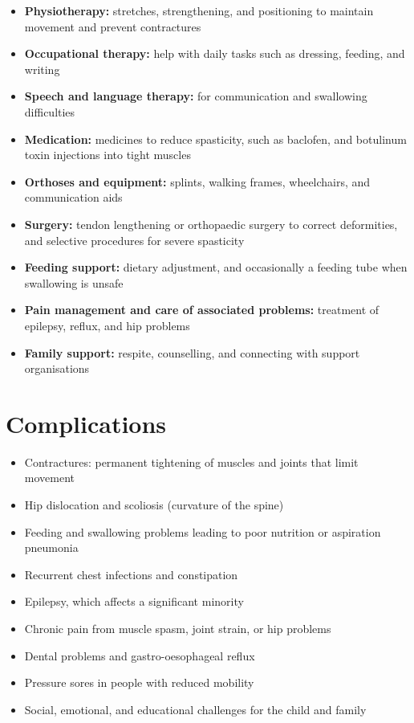 \begin{itemize}
    \item \textbf{Physiotherapy:} stretches, strengthening, and positioning to maintain movement and prevent contractures
    \item \textbf{Occupational therapy:} help with daily tasks such as dressing, feeding, and writing
    \item \textbf{Speech and language therapy:} for communication and swallowing difficulties
    \item \textbf{Medication:} medicines to reduce spasticity, such as baclofen, and botulinum toxin injections into tight muscles
    \item \textbf{Orthoses and equipment:} splints, walking frames, wheelchairs, and communication aids
    \item \textbf{Surgery:} tendon lengthening or orthopaedic surgery to correct deformities, and selective procedures for severe spasticity
    \item \textbf{Feeding support:} dietary adjustment, and occasionally a feeding tube when swallowing is unsafe
    \item \textbf{Pain management and care of associated problems:} treatment of epilepsy, reflux, and hip problems
    \item \textbf{Family support:} respite, counselling, and connecting with support organisations
\end{itemize}

\section*{Complications}
\begin{itemize}
    \item Contractures: permanent tightening of muscles and joints that limit movement
    \item Hip dislocation and scoliosis (curvature of the spine)
    \item Feeding and swallowing problems leading to poor nutrition or aspiration pneumonia
    \item Recurrent chest infections and constipation
    \item Epilepsy, which affects a significant minority
    \item Chronic pain from muscle spasm, joint strain, or hip problems
    \item Dental problems and gastro-oesophageal reflux
    \item Pressure sores in people with reduced mobility
    \item Social, emotional, and educational challenges for the child and family
\end{itemize}

